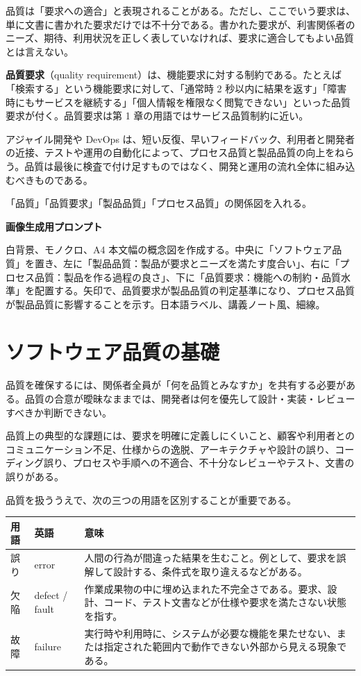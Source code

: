 \documentclass[11pt,a4paper]{article}
\newcommand{\term}[2]{\textbf{#1}（#2）}
\begin{document}
品質は「要求への適合」と表現されることがある。ただし、ここでいう要求は、単に文書に書かれた要求だけでは不十分である。書かれた要求が、利害関係者のニーズ、期待、利用状況を正しく表していなければ、要求に適合してもよい品質とは言えない。

\term{品質要求}{quality requirement}は、機能要求に対する制約である。たとえば「検索する」という機能要求に対して、「通常時 2 秒以内に結果を返す」「障害時にもサービスを継続する」「個人情報を権限なく閲覧できない」といった品質要求が付く。品質要求は第 1 章の用語ではサービス品質制約に近い。

アジャイル開発や DevOps は、短い反復、早いフィードバック、利用者と開発者の近接、テストや運用の自動化によって、プロセス品質と製品品質の向上をねらう。品質は最後に検査で付け足すものではなく、開発と運用の流れ全体に組み込むべきものである。

\begin{todobox}
「品質」「品質要求」「製品品質」「プロセス品質」の関係図を入れる。\par
\textbf{画像生成用プロンプト}\par
白背景、モノクロ、A4 本文幅の概念図を作成する。中央に「ソフトウェア品質」を置き、左に「製品品質：製品が要求とニーズを満たす度合い」、右に「プロセス品質：製品を作る過程の良さ」、下に「品質要求：機能への制約・品質水準」を配置する。矢印で、品質要求が製品品質の判定基準になり、プロセス品質が製品品質に影響することを示す。日本語ラベル、講義ノート風、細線。
\end{todobox}

\section{ソフトウェア品質の基礎}
品質を確保するには、関係者全員が「何を品質とみなすか」を共有する必要がある。品質の合意が曖昧なままでは、開発者は何を優先して設計・実装・レビューすべきか判断できない。

品質上の典型的な課題には、要求を明確に定義しにくいこと、顧客や利用者とのコミュニケーション不足、仕様からの逸脱、アーキテクチャや設計の誤り、コーディング誤り、プロセスや手順への不適合、不十分なレビューやテスト、文書の誤りがある。

品質を扱ううえで、次の三つの用語を区別することが重要である。

\noindent\begin{tabularx}{\textwidth}{@{}L{0.16\textwidth}L{0.18\textwidth}Y@{}}
\toprule
\textbf{用語} & \textbf{英語} & \textbf{意味} \\
\midrule
誤り & error & 人間の行為が間違った結果を生むこと。例として、要求を誤解して設計する、条件式を取り違えるなどがある。 \\
欠陥 & defect / fault & 作業成果物の中に埋め込まれた不完全さである。要求、設計、コード、テスト文書などが仕様や要求を満たさない状態を指す。 \\
故障 & failure & 実行時や利用時に、システムが必要な機能を果たせない、または指定された範囲内で動作できない外部から見える現象である。 \\
\bottomrule
\end{tabularx}
\end{document}
